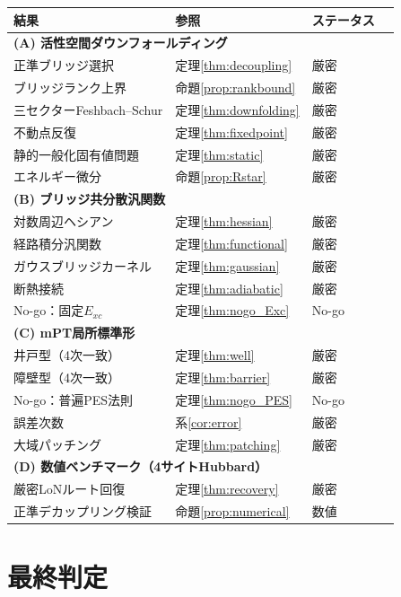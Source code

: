 \documentclass[12pt]{article}
\theoremstyle{plain}
\theoremstyle{definition}
\numberwithin{equation}{section}
\begin{document}
\begin{center}
\begin{tabular}{p{4.5cm}lll}
\toprule
結果 & 参照 & ステータス\\
\midrule
\multicolumn{3}{l}{\textbf{(A) 活性空間ダウンフォールディング}}\\
\quad 正準ブリッジ選択 & 定理\ref{thm:decoupling} & 厳密\\
\quad ブリッジランク上界 & 命題\ref{prop:rankbound} & 厳密\\
\quad 三セクターFeshbach--Schur & 定理\ref{thm:downfolding} & 厳密\\
\quad 不動点反復 & 定理\ref{thm:fixedpoint} & 厳密\\
\quad 静的一般化固有値問題 & 定理\ref{thm:static} & 厳密\\
\quad エネルギー微分 & 命題\ref{prop:Rstar} & 厳密\\
\midrule
\multicolumn{3}{l}{\textbf{(B) ブリッジ共分散汎関数}}\\
\quad 対数周辺ヘシアン & 定理\ref{thm:hessian} & 厳密\\
\quad 経路積分汎関数 & 定理\ref{thm:functional} & 厳密\\
\quad ガウスブリッジカーネル & 定理\ref{thm:gaussian} & 厳密\\
\quad 断熱接続 & 定理\ref{thm:adiabatic} & 厳密\\
\quad No-go：固定$E_{xc}$ & 定理\ref{thm:nogo_Exc} & No-go\\
\midrule
\multicolumn{3}{l}{\textbf{(C) mPT局所標準形}}\\
\quad 井戸型（4次一致） & 定理\ref{thm:well} & 厳密\\
\quad 障壁型（4次一致） & 定理\ref{thm:barrier} & 厳密\\
\quad No-go：普遍PES法則 & 定理\ref{thm:nogo_PES} & No-go\\
\quad 誤差次数 & 系\ref{cor:error} & 厳密\\
\quad 大域パッチング & 定理\ref{thm:patching} & 厳密\\
\midrule
\multicolumn{3}{l}{\textbf{(D) 数値ベンチマーク（4サイトHubbard）}}\\
\quad 厳密LoNルート回復 & 定理\ref{thm:recovery} & 厳密\\
\quad 正準デカップリング検証 & 命題\ref{prop:numerical} & 数値\\
\bottomrule
\end{tabular}
\end{center}

\section{最終判定}\label{sec:verdict}
\end{document}
